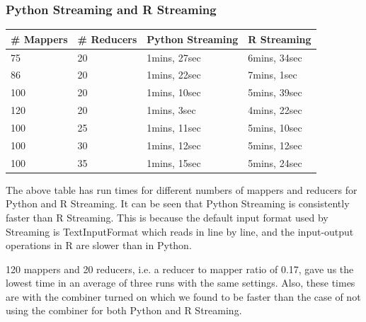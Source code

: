 \documentclass[
journal=jacsat, %
manuscript=article]{achemso}
\begin{document}
\subsubsection{Python Streaming and R Streaming}
\begin{table}[H]
\begin{tabular}{ l | l | l | l }
\# Mappers & \# Reducers & Python Streaming & R Streaming \\ \hline
 75 & 20 & 1mins, 27sec & 6mins, 34sec \\\hline
 86 & 20 & 1mins, 22sec & 7mins, 1sec  \\\hline
 100 & 20 & 1mins, 10sec & 5mins, 39sec  \\\hline
 120 & 20 & 1mins, 3sec & 4mins, 22sec  \\\hline
 100 & 25 & 1mins, 11sec & 5mins, 10sec  \\\hline
 100 & 30 & 1mins, 12sec & 5mins, 12sec  \\\hline
 100 & 35 & 1mins, 15sec & 5mins, 24sec  \\
\end{tabular}
\end{table}
The above table has run times for different numbers of mappers and reducers for Python and R Streaming. It can be seen that Python Streaming is consistently faster than R Streaming. This is because the default input format used by Streaming is TextInputFormat which reads in line by line, and the input-output operations in R are slower than in Python. 

120 mappers and 20 reducers, i.e. a reducer to mapper ratio of 0.17, gave us the lowest time in an average of three runs with the same settings. Also, these times are with the combiner turned on which we found to be faster than the case of not using the combiner for both Python and R Streaming.
\end{document}
